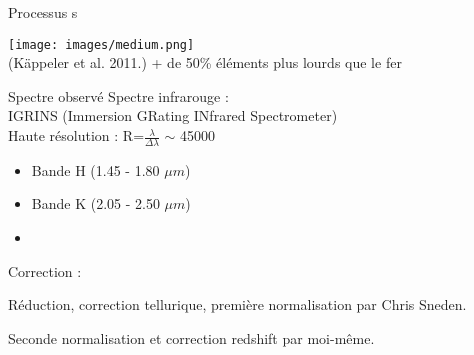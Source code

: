 \documentclass[10pt]{beamer}
\begin{document}
\begin{frame}[fragile]{Processus s}

    \begin{center}
        \texttt{[image: images/medium.png]} \\
        (Käppeler et al. 2011.)
        \vfill
        + de 50\% éléments plus lourds que le fer \\
    \end{center}
\end{frame}

\begin{frame}[fragile]{Spectre observé}
             Spectre infrarouge : \\
             IGRINS (Immersion GRating INfrared Spectrometer) \\ 
             Haute résolution : R=$\frac{\lambda}{\Delta \lambda}$ $\sim$ 45000 \\
    					\begin{itemize}
    						\item Bande H (1.45 - 1.80 $\mu m$)
    						\item Bande K (2.05 - 2.50 $\mu m$)
    						\item[]
    					\end{itemize}
        \vfill
        Correction : 

        Réduction, correction tellurique, première normalisation par Chris Sneden. 
        
        Seconde normalisation et correction redshift par moi-même. \\
\end{frame}
\end{document}
